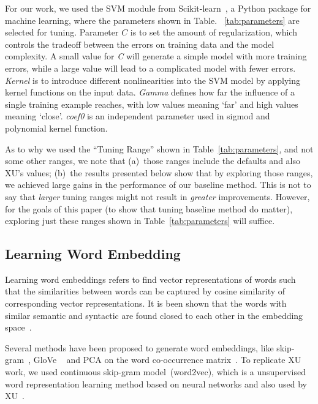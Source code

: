 \documentclass[sigconf,review, anonymous]{acmart}
\theoremstyle{break}
\newcommand{\tab}[1]{Table~\ref{tab:#1}}
\begin{document}
For our work, we used the SVM module from Scikit-learn~\cite{scikit-learn}, a Python package for machine learning,
where the parameters shown in Table. ~\ref{tab:parameters} are selected for tuning.
Parameter $\mathit{C}$ is to set the amount of regularization, which controls the tradeoff between
the errors on training data and the model complexity.  A small value for {\it C} will generate 
a simple model with more training errors, while a large value will lead to a complicated model with fewer
errors. {\it Kernel} is to introduce different nonlinearities into the SVM model by applying kernel functions
on the input data. {\it Gamma } defines how far the influence of a single training example reaches, 
with low values meaning `far' and high values meaning `close'. {\it coef0} is an independent parameter used
in sigmod and  polynomial kernel function.

As to why we used the ``Tuning Range'' shown in \tab{parameters}, and not some other ranges,
we note that (a)~those ranges include the defaults and also XU's values; (b)~the results presented below
show that by exploring those ranges,  we achieved large gains in the performance of our baseline method.
This is not to say that {\em larger} tuning ranges might not result in {\em greater} improvements.
However, for the goals of this paper (to show that tuning baseline method do matter), exploring
just these ranges shown in \tab{parameters} will suffice.




\subsection{Learning Word Embedding}\label{embedding}
Learning word embeddings refers to find vector representations
of words such that the similarities between words can be captured by cosine similarity of corresponding 
vector representations. It is been shown that the words with similar semantic and syntactic are found closed
to each other in the embedding space~\cite{mikolov2013distributed}.

Several methods have been proposed to generate word embeddings, 
like skip-gram~\cite{mikolov2013distributed}, GloVe ~\cite{pennington2014glove}
and PCA on the word co-occurrence matrix~\cite{lebret2013word}. To replicate XU work,
we used continuous skip-gram model~(word2vec),  which is a unsupervised word representation learning method based on
neural networks and also used by  XU~\cite{xu2016predicting}. 
\end{document}
